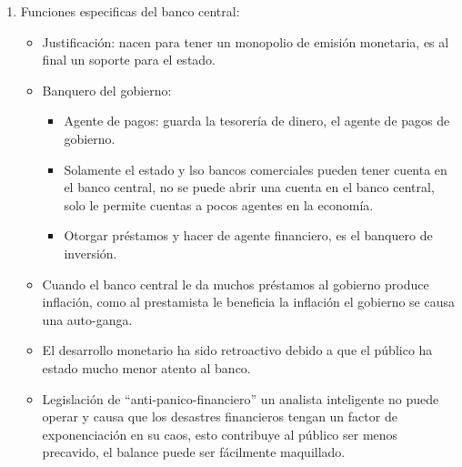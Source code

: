 \begin{enumerate}
    \item Funciones especificas del banco central: 
        \begin{itemize}
            \item Justificación: nacen para tener un monopolio de emisión monetaria, es al final un soporte para el estado.
            \item Banquero del gobierno:
                \begin{itemize}
                    \item Agente de pagos: guarda la tesorería de dinero, el agente de pagos de gobierno.
                    \item Solamente el estado y lso bancos comerciales pueden tener cuenta en el banco central, no se puede abrir una cuenta en el banco central, solo le permite cuentas a pocos agentes en la economía.
                    \item Otorgar préstamos y hacer de agente financiero, es el banquero de inversión.
                \end{itemize}
            
            \item Cuando el banco central le da muchos préstamos al gobierno produce inflación, como al prestamista le beneficia la inflación el gobierno se causa una auto-ganga.

            \item El desarrollo monetario ha sido retroactivo debido a que el público ha estado mucho menor atento al banco.

            \item Legislación de ``anti-panico-financiero'' un analista inteligente no puede operar y causa que los desastres financieros tengan un factor de exponenciación en su caos, esto contribuye al público ser menos precavido, el balance puede ser fácilmente maquillado. 
        \end{itemize}
\end{enumerate}
